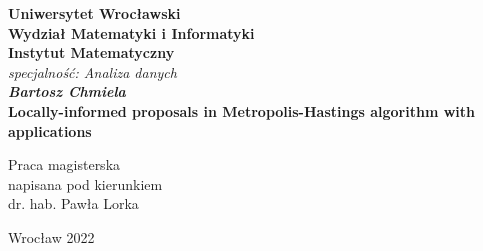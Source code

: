 \thispagestyle{empty}
\begin{center}
	\textbf{\large Uniwersytet Wroc\l{}awski\\
		Wydzia\l{} Matematyki i Informatyki\\
		Instytut Matematyczny}\\
	\textit{\large specjalno\'{s}\'{c}: Analiza danych}\\
	\vspace{4cm}
	\textbf{\textit{\large Bartosz Chmiela}\\
		\vspace{0.5cm}
		{\Large Locally-informed proposals in Metropolis-Hastings algorithm with applications}}\\
\end{center}
\vspace{3cm}
{\large \hspace*{6.5cm}Praca magisterska\\
	\hspace*{6.5cm}napisana pod kierunkiem\\
	\hspace*{6.5cm}dr. hab. Paw\l{}a Lorka }\\
\vfill
\begin{center}
	{\large Wroc\l{}aw 2022}\\
\end{center}